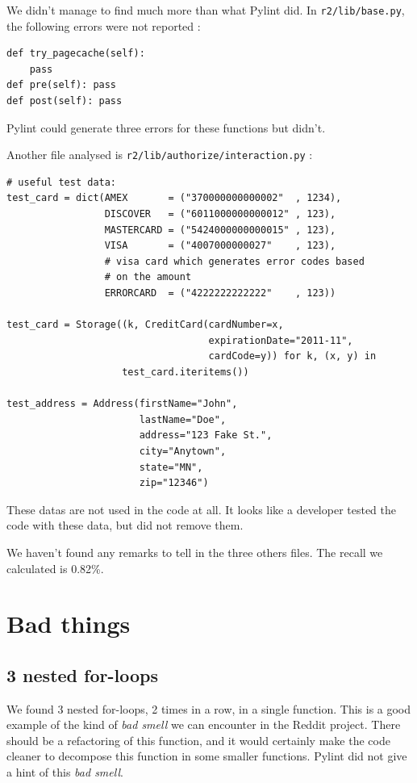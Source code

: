 \documentclass[11pt, a4paper]{article}
\newcommand{\tit}[1]{\textit{#1}}
\newcommand{\pyl}{\textsf{Pylint}}
\begin{document}
We didn't manage to find much more than what Pylint did.
In \texttt{r2/lib/base.py}, the following errors were not reported :

\begin{lstlisting}[caption= 3 useless functions]
def try_pagecache(self):
    pass
def pre(self): pass
def post(self): pass
\end{lstlisting}

\medskip
\pyl{} could generate three errors for these functions but didn't.


Another file analysed is \texttt{r2/lib/authorize/interaction.py} :

\begin{lstlisting}[caption= test data in the file..]
# useful test data:
test_card = dict(AMEX       = ("370000000000002"  , 1234),
                 DISCOVER   = ("6011000000000012" , 123),
                 MASTERCARD = ("5424000000000015" , 123),
                 VISA       = ("4007000000027"    , 123),
                 # visa card which generates error codes based
                 # on the amount
                 ERRORCARD  = ("4222222222222"    , 123))

test_card = Storage((k, CreditCard(cardNumber=x,
                                   expirationDate="2011-11",
                                   cardCode=y)) for k, (x, y) in
                    test_card.iteritems())

test_address = Address(firstName="John",
                       lastName="Doe",
                       address="123 Fake St.",
                       city="Anytown",
                       state="MN",
                       zip="12346")
\end{lstlisting}

These datas are not used in the code at all.
It looks like a developer tested the code with these data, but did not remove them.

We haven't found any remarks to tell in the three others files. The recall we calculated is 0.82\%.


\section{Bad things}

\subsection{3 nested for-loops}

We found 3 nested for-loops, 2 times in a row, in a single function.
This is a good example of the kind of \tit{bad smell} we can encounter in the Reddit project.
There should be a refactoring of this function, and it would certainly make the code cleaner to decompose this function in some smaller functions.
\pyl{} did not give a hint of this \tit{bad smell}.
\end{document}
